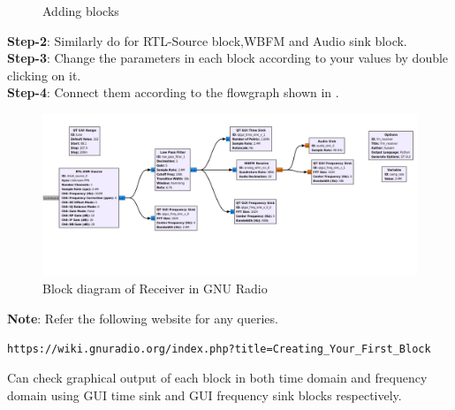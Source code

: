 \begin{enumerate}[label=\arabic*.,ref=\thesection.\theenumi]
\begin{figure}[H]
\caption{Adding blocks}
\label{fig:addblocks}
\end{figure}
\textbf{Step-2}:
Similarly do for RTL-Source block,WBFM and Audio sink block.
\\
\textbf{Step-3}:
Change the parameters in each block according to your values by double clicking on it.
\\
\textbf{Step-4}:
Connect them according to the flowgraph shown in .
\begin{figure}[H]
\centering
\includegraphics[width=\columnwidth]{fm/rx/figs/block_diagram.png}
\caption{Block diagram of Receiver in GNU Radio}
\label{fig:Rx_Block_diagram}
\end{figure}
\textbf{Note}:
Refer the following website for any queries.
\begin{lstlisting}
https://wiki.gnuradio.org/index.php?title=Creating_Your_First_Block
\end{lstlisting}

Can check graphical output of each block in both time domain and frequency domain using GUI time sink and GUI frequency sink blocks respectively.


\end{enumerate}
